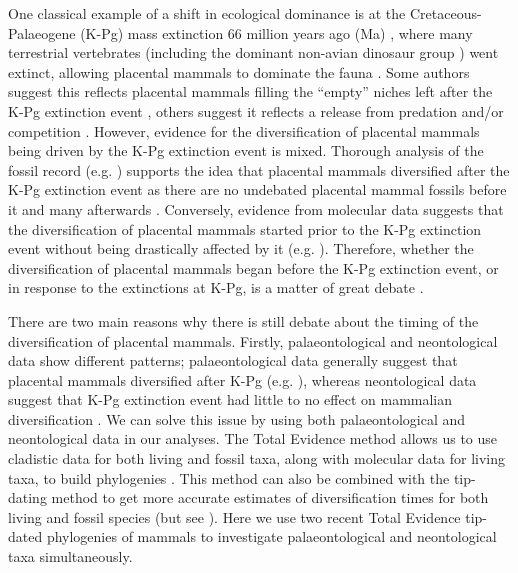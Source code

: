 \documentclass[10pt,letterpaper]{article}
\begin{document}
One classical example of a shift in ecological dominance is at the Cretaceous-Palaeogene (K-Pg) mass extinction 66 million years ago (Ma) \cite{rennetime2013}, where many terrestrial vertebrates (including the dominant non-avian dinosaur group \cite{archibald2011extinction,rennetime2013,Brusatte2015}) went extinct, allowing placental mammals to dominate the fauna \cite{archibald2011extinction,Lovergrove}. 
Some authors suggest this reflects placental mammals filling the ``empty'' niches left after the K-Pg extinction event \cite{archibald2011extinction,OLeary08022013}, others suggest it reflects a release from predation and/or competition \cite{Slater2012MEE,Lovergrove}.
However, evidence for the diversification of placental mammals being driven by the K-Pg extinction event is mixed.
Thorough analysis of the fossil record (e.g. \cite{goswamia2011,OLeary08022013}) supports the idea that placental mammals diversified after the K-Pg extinction event as there are no undebated placental mammal fossils before it and many afterwards \cite{archibald2011extinction,goswamia2011,Slater2012MEE,OLeary08022013,Wilson2013,Brusatte2015}. 
Conversely, evidence from molecular data suggests that the diversification of placental mammals started prior to the K-Pg extinction event without being drastically affected by it (e.g. \cite{Douady2003285,bininda-emondsthe2007,meredithimpacts2011,Stadler12042011}).
Therefore, whether the diversification of placental mammals began before the K-Pg extinction event, or in response to the extinctions at K-Pg, is a matter of great debate \cite{dosReis2012,OLeary08022013,Springer09082013,OLeary09082013,dosReis2014}. 

There are two main reasons why there is still debate about the timing of the diversification of placental mammals. 
Firstly, palaeontological and neontological data show different patterns; palaeontological data generally suggest that placental mammals diversified after K-Pg (e.g. \cite{OLeary08022013}), whereas neontological data suggest that K-Pg extinction event had little to no effect on mammalian diversification \cite{bininda-emondsthe2007,meredithimpacts2011,Stadler12042011}.
We can solve this issue by using both palaeontological and neontological data in our analyses. 
The Total Evidence method allows us to use cladistic data for both living and fossil taxa, along with molecular data for living taxa, to build phylogenies \cite{ronquista2012}. %
This method can also be combined with the tip-dating method \cite{ronquista2012,Wood01032013} to get more accurate estimates of diversification times for both living and fossil species (but see \cite{Arcila2015131}).
Here we use two recent Total Evidence tip-dated phylogenies of mammals \cite{Slater2012MEE,beckancient2014} to investigate palaeontological and neontological taxa simultaneously.
\end{document}
